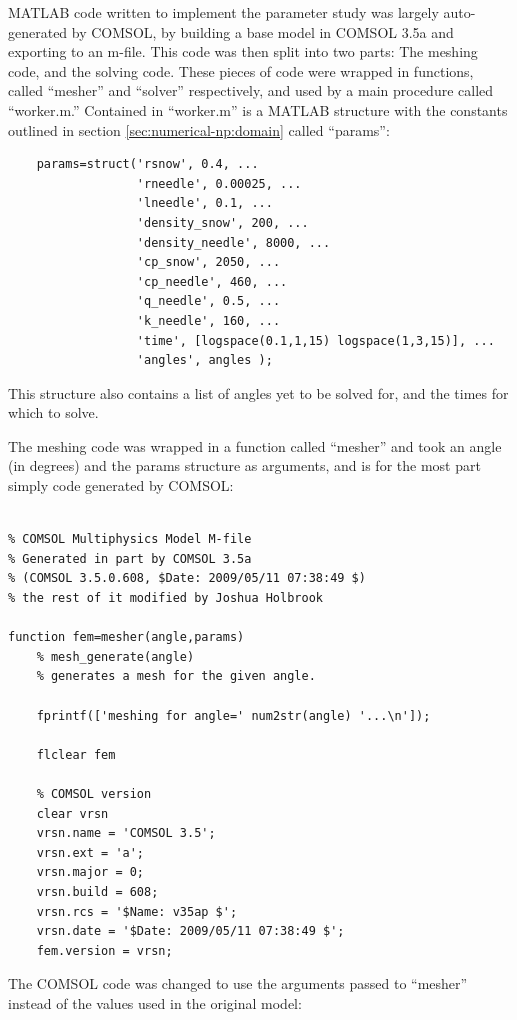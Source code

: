 MATLAB code written to implement the parameter study was largely auto-generated
by COMSOL, by building a base model in COMSOL 3.5a and exporting to an m-file.
This code was then split into two parts: The meshing code, and the solving code.
These pieces of code were wrapped in functions, called ``mesher'' and ``solver''
respectively, and used by a main procedure called ``worker.m.'' Contained in
``worker.m'' is a MATLAB structure with the constants outlined in section
\ref{sec:numerical-np:domain} called ``params'':

\small
\begin{verbatim}
    params=struct('rsnow', 0.4, ...
                  'rneedle', 0.00025, ...
                  'lneedle', 0.1, ...
                  'density_snow', 200, ...
                  'density_needle', 8000, ...
                  'cp_snow', 2050, ...
                  'cp_needle', 460, ...
                  'q_needle', 0.5, ...
                  'k_needle', 160, ...
                  'time', [logspace(0.1,1,15) logspace(1,3,15)], ...
                  'angles', angles );
\end{verbatim}
\normalsize

This structure also contains a list of angles yet to be solved for, and the
times for which to solve.

The meshing code was wrapped in a function called ``mesher'' and took an angle
(in degrees) and the params structure as arguments, and is for the most part
simply code generated by COMSOL:

\small
\begin{verbatim}

% COMSOL Multiphysics Model M-file
% Generated in part by COMSOL 3.5a
% (COMSOL 3.5.0.608, $Date: 2009/05/11 07:38:49 $)
% the rest of it modified by Joshua Holbrook

function fem=mesher(angle,params)
    % mesh_generate(angle)
    % generates a mesh for the given angle. 

    fprintf(['meshing for angle=' num2str(angle) '...\n']);

    flclear fem

    % COMSOL version
    clear vrsn
    vrsn.name = 'COMSOL 3.5';
    vrsn.ext = 'a';
    vrsn.major = 0;
    vrsn.build = 608;
    vrsn.rcs = '$Name: v35ap $';
    vrsn.date = '$Date: 2009/05/11 07:38:49 $';
    fem.version = vrsn;
\end{verbatim}
\normalsize

The COMSOL code was changed to use the arguments passed to ``mesher'' instead of
the values used in the original model:

